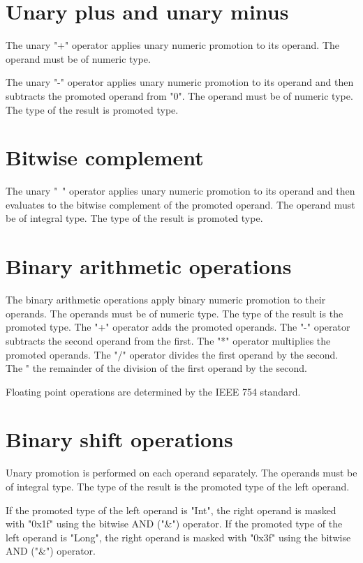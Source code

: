 \section{Unary plus and unary minus}

The unary \xcd"+" operator applies unary numeric promotion to
its operand.   The operand must be of numeric type.

The unary \xcd"-" operator
applies unary numeric promotion to its operand
and then
subtracts the promoted operand from \xcd"0".
The operand must be of numeric type.
The type of the result is promoted type.

\section{Bitwise complement}

 The unary \xcd"~" operator
applies unary numeric promotion to its operand
and then
 evaluates to the bitwise complement of
 the promoted operand.
  The operand must be of integral type.
The type of the result is promoted type.

\section{Binary arithmetic operations} 

The binary arithmetic operations apply binary numeric promotion
to their operands. The operands must be of numeric type.
The type of the result is the promoted type.
The
\xcd"+" operator adds the promoted operands. The \xcd"-" operator
subtracts the second operand from the first. The \xcd"*" operator
multiplies the  promoted  operands. The \xcd"/" operator
divides the
first  operand  by the second.
The \xcd"%
the remainder of the division of the first operand by the
second.

Floating point operations are determined by the IEEE 754
standard. 



\section{Binary shift operations}

Unary promotion is performed on each operand separately. 
The operands must be of integral type.
The type of the result is the promoted type of the left operand.

If the promoted type of the left operand is \xcd"Int",
the right operand is masked with \xcd"0x1f" using the bitwise
AND (\xcd"&") operator.
If the promoted type of the left operand is \xcd"Long",
the right operand is masked with \xcd"0x3f" using the bitwise
AND (\xcd"&") operator.

